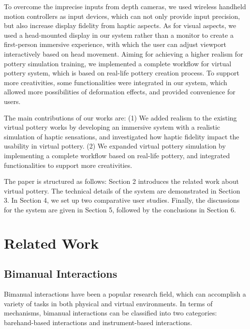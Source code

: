 \documentclass{svjour3}                     %
\begin{document}
{To overcome the imprecise inputs from depth cameras, we used wireless handheld motion controllers as input devices, which can not only provide input precision, but also increase display fidelity from haptic aspects.
%
As for visual aspects, we used a head-mounted display in our system rather than a monitor to create a first-person immersive experience, with which the user can adjust viewport interactively based on head movement.
%
Aiming for achieving a higher realism for pottery simulation training, we implemented a complete workflow for virtual pottery system, which is based on real-life pottery creation process.
%
To support more creativities, some functionalities were integrated in our system, which allowed more possibilities of deformation effects, and provided convenience for users.

The main contributions of our works are:
(1) We added realism to the existing virtual pottery works by developing an immersive system with a realistic simulation of haptic sensations, and investigated how haptic fidelity impact the usability in virtual pottery.
(2) We expanded virtual pottery simulation by implementing a complete workflow based on real-life pottery, and integrated functionalities to support more creativities.

The paper is structured as follows:
Section 2 introduces the related work about virtual pottery.
The technical details of the system are demonstrated in Section 3.
In Section 4, we set up two comparative user studies.
Finally, the discussions for the system are given in Section 5, followed by the conclusions in Section 6.

}

\section{Related Work}
\label{sec:related}

\subsection{Bimanual Interactions}
\label{sec:bimanual}
Bimanual interactions have been a popular research field, which can accomplish a variety of tasks in both physical and virtual environments.
In terms of mechanisms, bimanual interactions can be classified into two categories: barehand-based interactions and instrument-based interactions.
\end{document}
